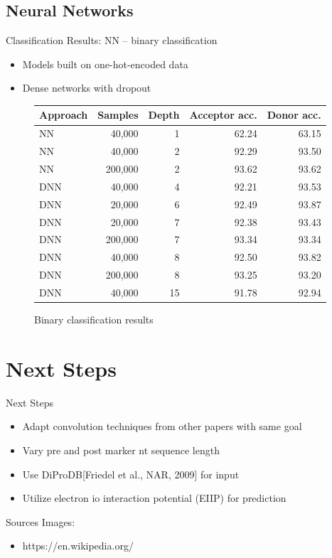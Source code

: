 \documentclass[10pt]{beamer}
\begin{document}
\subsection{Neural Networks}
\begin{frame}{Classification Results: NN -- binary classification}
	\begin{itemize}
		\item Models built on one-hot-encoded data
		\item Dense networks with dropout
	\end{itemize}
	\begin{figure}
		\centering
		\begingroup
		\def\arraystretch{1.2}
		\begin{tabular}{|l|r|r|r|r|}
			\hline
			Approach & Samples & Depth & Acceptor acc. & Donor acc. \\
			\hline
			NN & 40,000 & 1 & 62.24 & 63.15 \\
			\hline
			NN & 40,000 & 2 & 92.29 & 93.50 \\
			NN & 200,000 & 2 & 93.62 & 93.62 \\
			\hline
			DNN & 40,000 & 4 & 92.21 & 93.53 \\
			\hline
			DNN & 20,000 & 6 & 92.49 & 93.87 \\
			\hline
			DNN & 20,000 & 7 & 92.38 & 93.43 \\
			DNN & 200,000 & 7 & 93.34 & 93.34 \\
			\hline
			DNN & 40,000 & 8 & 92.50 & 93.82 \\
			DNN & 200,000 & 8 & 93.25 & 93.20 \\
			\hline
			DNN & 40,000 & 15 & 91.78 & 92.94 \\
			
			\hline  
		\end{tabular}
		\endgroup
		\caption{Binary classification results}
	\end{figure}
\end{frame}

\section{Next Steps}
\begin{frame}{Next Steps}
	\begin{itemize}
		\item Adapt convolution techniques from other papers with same goal
		\item Vary pre and post marker nt sequence length
		\item Use DiProDB[Friedel et al., NAR, 2009] for input
		\item Utilize electron io interaction potential (EIIP) for prediction
	\end{itemize}
\end{frame}


\begin{frame}{Sources}
	Images:
	\begin{itemize}
		\item https://en.wikipedia.org/
	\end{itemize}
\end{frame}
\end{document}
